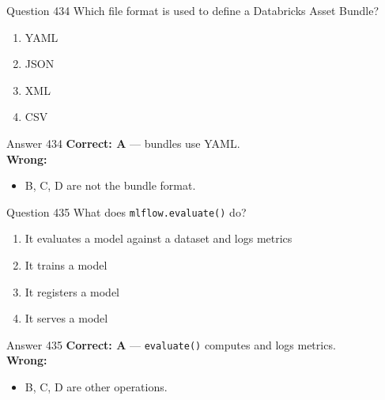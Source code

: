 \documentclass[aspectratio=169,11pt]{beamer}
\begin{document}
	\begin{frame}{Question 434}
		Which file format is used to define a Databricks Asset Bundle?
		\begin{enumerate}[label=\Alph*.]
			\item YAML
			\item JSON
			\item XML
			\item CSV
		\end{enumerate}
	\end{frame}
	\begin{frame}{Answer 434}
		\textbf{Correct: A} --- bundles use YAML.\\
		\vspace{0.5em}
		\textbf{Wrong:}
		\begin{itemize}
			\item B, C, D are not the bundle format.
		\end{itemize}
	\end{frame}
	
	\begin{frame}{Question 435}
		What does \texttt{mlflow.evaluate()} do?
		\begin{enumerate}[label=\Alph*.]
			\item It evaluates a model against a dataset and logs metrics
			\item It trains a model
			\item It registers a model
			\item It serves a model
		\end{enumerate}
	\end{frame}
	\begin{frame}{Answer 435}
		\textbf{Correct: A} --- \texttt{evaluate()} computes and logs metrics.\\
		\vspace{0.5em}
		\textbf{Wrong:}
		\begin{itemize}
			\item B, C, D are other operations.
		\end{itemize}
	\end{frame}
	
\end{document}
